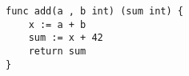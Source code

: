 \begin{lstlisting}[language=Golang, label=lst:stack-example-function, caption=Example function to illustrate Go stack frames]
func add(a , b int) (sum int) {
    x := a + b
    sum := x + 42
    return sum
}
\end{lstlisting}
